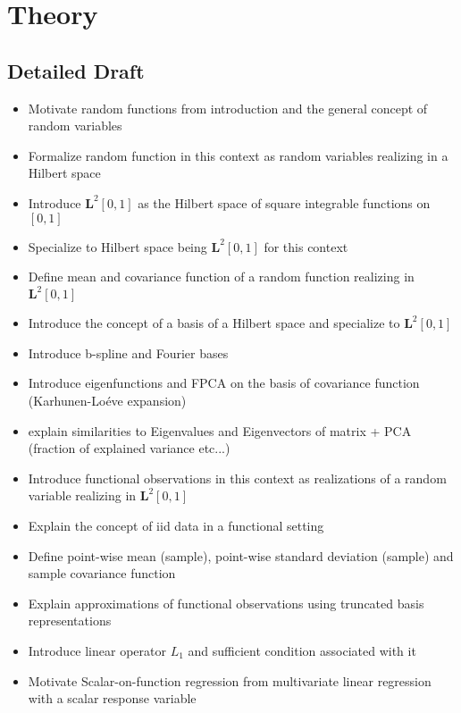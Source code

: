 \documentclass[11pt,twoside,a4paper]{article}
\begin{document}
	\section{Theory}
	
	\subsection{Detailed Draft}
	\begin{itemize}
		\item Motivate random functions from introduction and the general concept of random variables
		\item Formalize random function in this context as random variables realizing in a Hilbert space
		\item Introduce $\mathbf{L}^2[0,1]$ as the Hilbert space of square integrable functions on $[0,1]$
		\item Specialize to Hilbert space being $\mathbf{L}^2[0,1]$ for this context
		\item Define mean and covariance function of a random function realizing in $\mathbf{L}^2[0,1]$
		\item Introduce the concept of a basis of a Hilbert space and specialize to $\mathbf{L}^2[0,1]$
		\item Introduce b-spline and Fourier bases
		\item Introduce eigenfunctions and FPCA on the basis of covariance function (Karhunen-Lo\'{e}ve expansion)
		\item explain similarities to Eigenvalues and Eigenvectors of matrix + PCA (fraction of explained variance etc...)
		\item Introduce functional observations in this context as realizations of a random variable realizing in $\mathbf{L}^2[0,1]$
		\item Explain the concept of iid data in a functional setting
		\item Define point-wise mean (sample), point-wise standard deviation (sample) and sample covariance function
		\item Explain approximations of functional observations using truncated basis representations
		\item Introduce linear operator $L_1$ and sufficient condition associated with it
		\item Motivate Scalar-on-function regression from multivariate linear regression with a scalar response variable
	\end{itemize}
\end{document}
